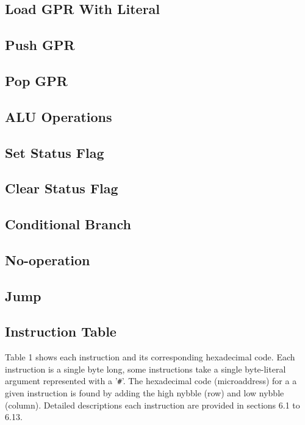\documentclass[a4paper,12pt]{article}
\begin{document}
\subsection{Load GPR With Literal}
\subsection{Push GPR}
\subsection{Pop GPR}
\subsection{ALU Operations}
\subsection{Set Status Flag}
\subsection{Clear Status Flag}
\subsection{Conditional Branch}
\subsection{No-operation}
\subsection{Jump}
\subsection{Instruction Table}
Table 1 shows each instruction and its corresponding hexadecimal code. Each
instruction is a single byte long, some instructions take a single byte-literal 
argument represented with a '\texttt{\#}'. The hexadecimal code (microaddress) 
for a a given instruction is found by adding the high nybble (row) and low 
nybble (column). Detailed descriptions each instruction are provided in 
sections 6.1 to 6.13.
\par
\end{document}
